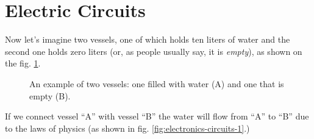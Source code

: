 \documentclass[../sparc.tex]{subfiles}
\begin{document}
\section{Electric Circuits}


Now let's imagine two vessels, one of which holds ten liters of water and the
second one holds zero liters (or, as people usually say, it is \emph{empty}), as
shown on the fig. \ref{fig:electronics-circuits-0}.

\begin{figure}[ht]
  \centering
  \caption{An example of two vessels: one filled with water (A) and one that is
    empty (B).}
  \label{fig:electronics-circuits-0}
\end{figure}

If we connect vessel ``A'' with vessel ``B'' the water will flow from ``A'' to
``B'' due to the laws of physics (as shown in fig.
\ref{fig:electronics-circuits-1}.)
\end{document}
